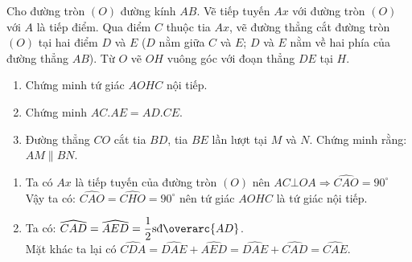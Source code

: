 \begin{ex}%
    Cho đường tròn $(O)$ đường kính $AB$. Vẽ tiếp tuyến $Ax$ với đường tròn $(O)$ với $A$ là tiếp điểm. Qua điểm $C$ thuộc tia $Ax$, vẽ đường thẳng cắt đường tròn $(O)$ tại hai điểm $D$ và $E$ ($D$ nằm giữa $C$ và $E$; $D$ và $E$ nằm về hai phía của đường thẳng $AB$). Từ $O$ vẽ $OH$ vuông góc với đoạn thẳng $DE$ tại $H$.
    \begin{enumerate}
        \item Chứng minh tứ giác $AOHC$ nội tiếp.
        \item Chứng minh $AC.AE=AD.CE$.
        \item Đường thẳng $CO$ cắt tia $BD$, tia $BE$ lần lượt tại $M$ và $N$. Chứng minh rằng: $AM\parallel BN$.
    \end{enumerate}
\loigiai
    {\begin{center}
    \end{center}
     \begin{enumerate}
     	\item Ta có $Ax$ là tiếp tuyến của đường tròn $(O)$ nên $AC\bot OA\Rightarrow \widehat{CAO}=90^\circ$\\
     	Vậy ta có: $\widehat{CAO}=\widehat{CHO}=90^\circ$ nên tứ giác $AOHC$ là tứ giác nội tiếp.
     	\item Ta có: $\widehat{CAD}=\widehat{AED}=\dfrac{1}{2}\textrm{sđ}\overarc{AD}$.\\
     	Mặt khác ta lại có $\widehat{CDA}=\widehat{DAE}+\widehat{AED}=\widehat{DAE}+\widehat{CAD}=\widehat{CAE}$.\\

\end{enumerate}}
\end{ex}
